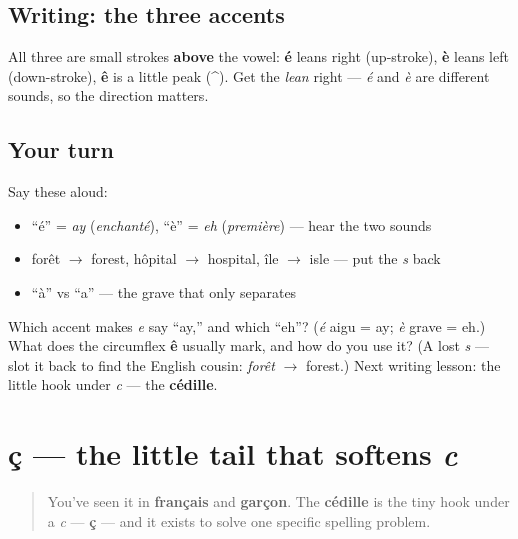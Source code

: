 \subsection*{Writing: the three accents}

All three are small strokes \textbf{above} the vowel: \textbf{é} leans right (up-stroke), \textbf{è} leans left (down-stroke), \textbf{ê} is a little peak (\textasciicircum{}). Get the \emph{lean} right — \emph{é} and \emph{è} are different sounds, so the direction matters.

\subsection*{Your turn}
Say these aloud:

\begin{itemize}
\raggedright
  \item \textquotedblleft{}é\textquotedblright{} = \emph{ay} (\emph{enchanté}), \textquotedblleft{}è\textquotedblright{} = \emph{eh} (\emph{première}) — hear the two sounds
  \item forêt $\to$ forest, hôpital $\to$ hospital, île $\to$ isle — put the \emph{s} back
  \item \textquotedblleft{}à\textquotedblright{} vs \textquotedblleft{}a\textquotedblright{} — the grave that only separates
\end{itemize}

\begin{tcolorbox}[breakable,colback=teal!4,colframe=teal!35!black,title={Before you move on}]
Which accent makes \emph{e} say \textquotedblleft{}ay,\textquotedblright{} and which \textquotedblleft{}eh\textquotedblright{}? (\emph{é} aigu = ay; \emph{è} grave = eh.) What does the circumflex \textbf{ê} usually mark, and how do you use it? (A lost \emph{s} — slot it back to find the English cousin: \emph{forêt} $\to$ forest.) Next writing lesson: the little hook under \emph{c} — the \textbf{cédille}.
\end{tcolorbox}
\section[ç]{ç — the little tail that softens \emph{c}}

\label{lesson:FR-W02-cedille}



\begin{quote}
You've seen it in \textbf{français} and \textbf{garçon}. The \textbf{cédille} is the tiny hook under a \emph{c} — \textbf{ç} — and it exists to solve one specific spelling problem.
\end{quote}


